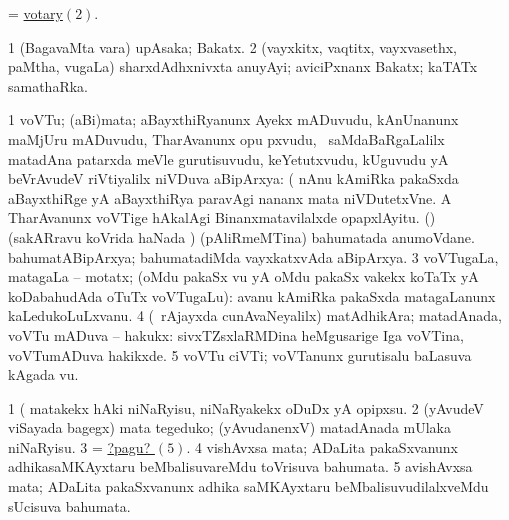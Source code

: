 \bentry 
{} 
\gl{\nA}
\expl{}
\bmng
 = \hyperlink{votary(2)}{votary\((2)\)}. 
\emng
\eentry

\bentry 
{} 
\gl{\nA}
\bmng
\bnum
\num{1} (BagavaMta \mo vara) upAsaka; Bakatx. 
\hypertarget{votary(2)}{} 
\num{2} (vayxkitx, vaqtitx, vayxvasethx, paMtha, \mo vugaLa) sharxdAdhxnivxta anuyAyi; aviciPxnanx Bakatx; kaTATx samathaRka. 
\enum
\emng
\eentry

\bentry
{} 
\gl{\nA}
\expl{}
\bmng
\bnum
\num{1} voVTu; (aBi)mata; aBayxthiRyanunx Ayekx mADuvudu, kAnUnanunx maMjUru mADuvudu, TharAvanunx opu pxvudu, \mo\ saMdaBaRgaLalilx matadAna patarxda meVle gurutisuvudu, keYetutxvudu, kUguvudu yA beVrAvudeV riVtiyalilx niVDuva aBipArxya:  (  nAnu kAmiRka pakaSxda aBayxthiRge yA aBayxthiRya paravAgi nananx mata niVDutetxVne.  A TharAvanunx voVTige hAkalAgi Binanxmatavilalxde opapxlAyitu. 
 (\birx) 
\banum
{} (sakARravu koVrida haNada \vi) (pAliRmeMTina) bahumatada anumoVdane. 
 bahumatABipArxya; bahumatadiMda vayxkatxvAda aBipArxya. 
\eanum
\numie
\num{3} voVTugaLa, matagaLa -- motatx; (oMdu pakaSx \mo vu yA oMdu pakaSx \mo vakekx koTaTx yA koDabahudAda oTuTx voVTugaLu):  avanu kAmiRka pakaSxda matagaLanunx kaLedukoLuLxvanu. 
\num{4} (\kanmu\ rAjayxda cunAvaNeyalilx) matAdhikAra; matadAnada, voVTu mADuva -- hakukx:  sivxTZsxlaRMDina heMgusarige Iga voVTina, voVTumADuva hakikxde. 
\num{5} voVTu ciVTi; voVTanunx gurutisalu baLasuva kAgada \mo vu. 
\enum
\emng

\noindent 
\gl{\pagu}
\expl{}
\bmng
\bnum
\num{1}  (  matakekx hAki niNaRyisu, niNaRyakekx oDuDx yA opipxsu. 
\num{2}  (yAvudeV viSayada bagegx) mata tegeduko; (yAvudanenxV) matadAnada mUlaka niNaRyisu. 
\num{3}  = \hyperlink{vote1 pagu5}{?pagu? \((5)\)}. 
\num{4}  vishAvxsa mata; ADaLita pakaSxvanunx adhikasaMKAyxtaru beMbalisuvareMdu toVrisuva bahumata. 
\hypertarget{vote1 pagu5}{} 
\num{5}  avishAvxsa mata; ADaLita pakaSxvanunx adhika saMKAyxtaru beMbalisuvudilalxveMdu sUcisuva bahumata. 
\enum
\emng
\eentry

